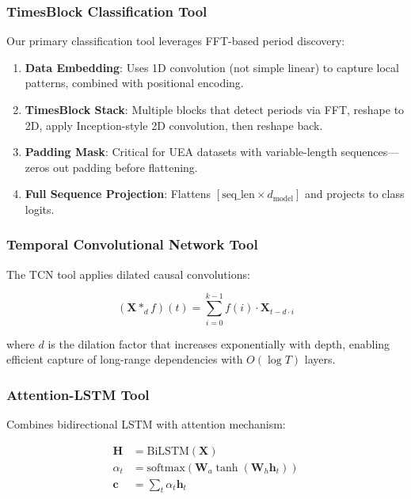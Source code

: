 \subsubsection{TimesBlock Classification Tool}

Our primary classification tool leverages FFT-based period discovery:

\begin{enumerate}[leftmargin=*, itemsep=1pt]
    \item \textbf{Data Embedding}: Uses 1D convolution (not simple linear) to capture local patterns, combined with positional encoding.
    \item \textbf{TimesBlock Stack}: Multiple blocks that detect periods via FFT, reshape to 2D, apply Inception-style 2D convolution, then reshape back.
    \item \textbf{Padding Mask}: Critical for UEA datasets with variable-length sequences—zeros out padding before flattening.
    \item \textbf{Full Sequence Projection}: Flattens $[\text{seq\_len} \times d_{\text{model}}]$ and projects to class logits.
\end{enumerate}

\subsubsection{Temporal Convolutional Network Tool}

The TCN tool applies dilated causal convolutions:

\begin{equation}
    (\mathbf{X} *_d f)(t) = \sum_{i=0}^{k-1} f(i) \cdot \mathbf{X}_{t - d \cdot i}
\end{equation}

where $d$ is the dilation factor that increases exponentially with depth, enabling efficient capture of long-range dependencies with $O(\log T)$ layers.

\subsubsection{Attention-LSTM Tool}

Combines bidirectional LSTM with attention mechanism:

\begin{align}
    \mathbf{H} &= \text{BiLSTM}(\mathbf{X}) \\
    \alpha_t &= \text{softmax}(\mathbf{W}_a \tanh(\mathbf{W}_h \mathbf{h}_t)) \\
    \mathbf{c} &= \sum_t \alpha_t \mathbf{h}_t
\end{align}

